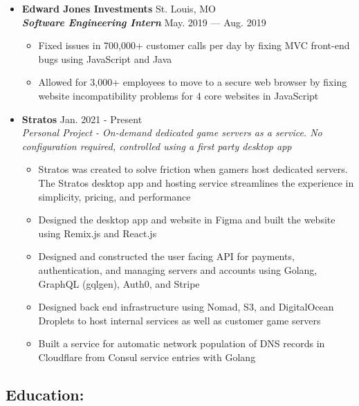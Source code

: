\documentclass[9pt,oneside]{memoir}
\begin{document}
\begin{itemize}
      \item[] \textbf{Edward Jones Investments}
            \hfill St. Louis, MO\\
            \textit{\textbf{Software Engineering Intern}}
            \hfill May. 2019 --- Aug. 2019
            \begin{itemize}
                  \item[\textbullet] Fixed issues in 700,000+ customer calls per day by fixing MVC front-end bugs using JavaScript and Java
                  \item[\textbullet] Allowed for 3,000+ employees to move to a secure web browser by fixing website incompatibility problems for 4 core websites in JavaScript
            \end{itemize}

      \item[] \textbf{Stratos}
            \hfill Jan. 2021 - Present\\
            \textit{Personal Project - On-demand dedicated game servers as a service. No configuration required, controlled using a first party desktop app}
            \begin{itemize}
                  \item[\textbullet] Stratos was created to solve friction when gamers host dedicated servers. The Stratos desktop app and hosting service streamlines the experience in simplicity, pricing, and performance
                  \item[\textbullet] Designed the desktop app and website in Figma and built the website using Remix.js and React.js
                  \item[\textbullet] Designed and constructed the user facing API for payments, authentication, and managing servers and accounts using Golang, GraphQL (gqlgen), Auth0, and Stripe
                  \item[\textbullet] Designed back end infrastructure using Nomad, S3, and DigitalOcean Droplets to host internal services as well as customer game servers
                  \item[\textbullet] Built a service for automatic network population of DNS records in Cloudflare from Consul service entries with Golang
            \end{itemize}
\end{itemize}

\vspace*{-16px}
\subsection*{Education:}
\end{document}
